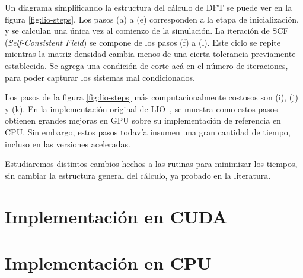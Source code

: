 Un diagrama simplificando la estructura del c\'alculo de DFT se puede ver en la figura \ref{fig:lio-steps}.
Los pasos (a) a (e) corresponden a la etapa de inicializaci\'on, y se calculan una \'unica vez
al comienzo de la simulaci\'on. La iteraci\'on de SCF (\textit{Self-Consistent Field}) se
compone de los pasos (f) a (l). Este ciclo se repite mientras la matriz densidad cambia
menos de una cierta tolerancia previamente establecida. Se agrega una condici\'on de corte ac\'a
en el n\'umero de iteraciones, para poder capturar los sistemas mal condicionados.~\cite{LIO}

Los pasos de la figura \ref{fig:lio-steps} m\'as computacionalmente costosos son (i), (j) y (k).
En la implementaci\'on original de LIO~\cite{TesisNitsche}, se muestra como estos pasos
obtienen grandes mejoras en GPU sobre su implementaci\'on de referencia en CPU. Sin embargo,
estos pasos todav\'ia insumen una gran cantidad de tiempo, incluso en las versiones aceleradas.

Estudiaremos distintos cambios hechos a las rutinas para minimizar los tiempos,
sin cambiar la estructura general del c\'alculo, ya probado en la literatura.

\section{Implementaci\'on en CUDA}



\section{Implementaci\'on en CPU}


